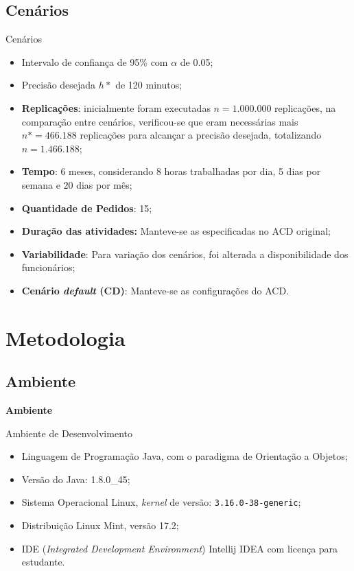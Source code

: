 \documentclass[xcolor=dvipsnames]{beamer}
\let\olditem=\item%
\renewcommand{\item}{\olditem \justifying}%
\begin{document}
\subsection{Cenários}
	
\begin{frame}{Cenários}
\fontsize{10pt}{7.2}\selectfont
	\begin{itemize}
		\item Intervalo de confiança de 95\% com $\alpha$ de 0.05;
        \medskip
		\item Precisão desejada $h*$ de 120 minutos;
        \medskip
		\item \textbf{Replicações}: inicialmente foram executadas $n=1.000.000$ replicações, na comparação entre cenários, verificou-se que eram necessárias mais $n*=466.188$ replicações para alcançar a precisão desejada, totalizando $n=1.466.188$;
        \medskip
		\item \textbf{Tempo}: 6 meses, considerando 8 horas trabalhadas por dia, 5 dias por semana e 20 dias por mês;
        \medskip
		\item \textbf{Quantidade de Pedidos}: 15;
        \medskip
		\item \textbf{Duração das atividades:} Manteve-se as especificadas no ACD original;
        \medskip
		\item \textbf{Variabilidade}: Para variação dos cenários, foi alterada a disponibilidade dos funcionários;
        \medskip
		\item \textbf{Cenário \textit{default} (CD)}: Manteve-se as configurações do ACD.
	\end{itemize}
\end{frame}
	
\section{Metodologia}

\subsection{Ambiente}
	
\begin{frame}{}
	\centering
	\Huge \color{blue} \textbf{Ambiente}
\end{frame}
	
\begin{frame}{Ambiente de Desenvolvimento}
	\begin{itemize}
		\item Linguagem de Programação Java, com o paradigma de Orientação a Objetos;
        \bigskip
		\item Versão do Java: 1.8.0\_45;
        \bigskip
		\item Sistema Operacional Linux, \textit{kernel} de versão: {\tt 3.16.0-38-generic};
        \bigskip
		\item Distribuição Linux Mint, versão 17.2;
        \bigskip
		\item IDE (\textit{Integrated Development Environment}) Intellij IDEA com licença para estudante.
	\end{itemize}
\end{frame}
	
\end{document}
